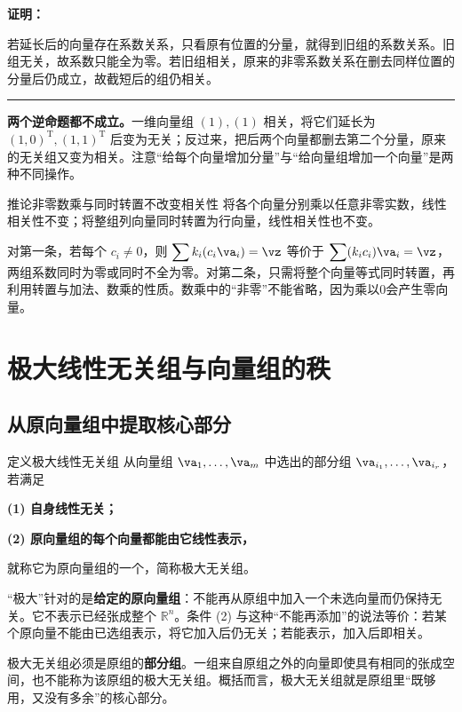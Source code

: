 \documentclass[a4paper,12pt,twoside,openany,fontset=none]{ctexbook}
\let\oldsum\sum
\renewcommand{\sum}{\displaystyle\oldsum}
\newenvironment{corollary}[1][]{\begin{thmBox}{推论}{#1}}{\end{thmBox}}
\newcounter{definition}[chapter]
\newenvironment{definition}[1][]{\begin{defBox}{定义}{#1}}{\end{defBox}}
\renewenvironment{proof}{
    \par\vspace{0.5em}\noindent
    \textbf{\color{LogicColor} 证明：}
}{
    \hfill \textcolor{LogicColor}{\rule{0.6em}{0.6em}} \par
}
\numberwithin{equation}{chapter}
\begin{document}
\begin{proof}
若延长后的向量存在系数关系，只看原有位置的分量，就得到旧组的系数关系。旧组无关，故系数只能全为零。若旧组相关，原来的非零系数关系在删去同样位置的分量后仍成立，故截短后的组仍相关。
\end{proof}

\textbf{两个逆命题都不成立。}一维向量组 $(1),(1)$ 相关，将它们延长为 $(1,0)^{\mathrm T},(1,1)^{\mathrm T}$ 后变为无关；反过来，把后两个向量都删去第二个分量，原来的无关组又变为相关。注意“给每个向量增加分量”与“给向量组增加一个向量”是两种不同操作。

\begin{corollary}[非零数乘与同时转置不改变相关性]
将各个向量分别乘以任意非零实数，线性相关性不变；将整组列向量同时转置为行向量，线性相关性也不变。
\end{corollary}

对第一条，若每个 $c_i\ne0$，则 $\sum k_i(c_i\va_i)=\vz$ 等价于 $\sum(k_i c_i)\va_i=\vz$，两组系数同时为零或同时不全为零。对第二条，只需将整个向量等式同时转置，再利用转置与加法、数乘的性质。数乘中的“非零”不能省略，因为乘以0会产生零向量。

\section{极大线性无关组与向量组的秩}
\label{sec:one-rank}

\subsection*{从原向量组中提取核心部分}

\begin{definition}[极大线性无关组]
从向量组 $\va_1,\ldots,\va_m$ 中选出的部分组 $\va_{i_1},\ldots,\va_{i_r}$，若满足

\textbf{(1) 自身线性无关；}

\textbf{(2) 原向量组的每个向量都能由它线性表示，}

就称它为原向量组的一个\textbf{}，简称极大无关组。
\end{definition}

“极大”针对的是\textbf{给定的原向量组}：不能再从原组中加入一个未选向量而仍保持无关。它不表示已经张成整个 $\mathbb{R}^n$。条件 (2) 与这种“不能再添加”的说法等价：若某个原向量不能由已选组表示，将它加入后仍无关；若能表示，加入后即相关。

极大无关组必须是原组的\textbf{部分组}。一组来自原组之外的向量即使具有相同的张成空间，也不能称为该原组的极大无关组。概括而言，极大无关组就是原组里“既够用，又没有多余”的核心部分。
\end{document}
